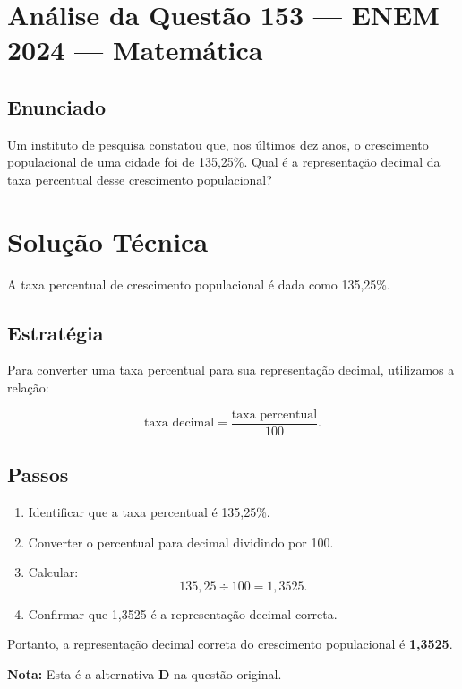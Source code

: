 \documentclass{article}
\begin{document}
\section*{Análise da Questão 153 — ENEM 2024 — Matemática}

\subsection*{Enunciado}
Um instituto de pesquisa constatou que, nos últimos dez anos, o crescimento populacional de uma cidade foi de 135,25\%. Qual é a representação decimal da taxa percentual desse crescimento populacional?

\section{Solução Técnica}

A taxa percentual de crescimento populacional é dada como 135,25\%.

\subsection{Estratégia}
Para converter uma taxa percentual para sua representação decimal, utilizamos a relação:

\begin{equation}
\text{taxa decimal} = \frac{\text{taxa percentual}}{100}.
\end{equation}

\subsection{Passos}
\begin{enumerate}
  \item Identificar que a taxa percentual é 135,25\%.
  \item Converter o percentual para decimal dividindo por 100.
  \item Calcular:
  \begin{equation}
  135,25 \div 100 = 1,3525.
  \end{equation}
  \item Confirmar que 1,3525 é a representação decimal correta.
\end{enumerate}

\noindent Portanto, a representação decimal correta do crescimento populacional é \textbf{1,3525}.

\noindent \textbf{Nota:} Esta é a alternativa \textbf{D} na questão original.
\end{document}
